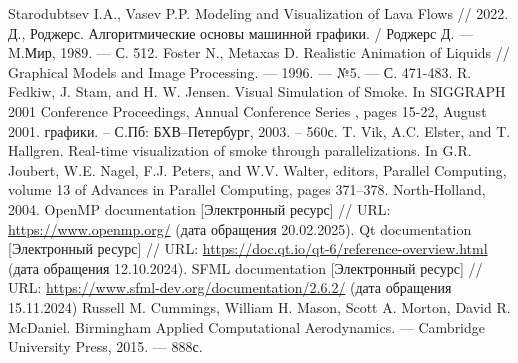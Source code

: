 \begin{thebibliography}{}
	 Starodubtsev I.A., Vasev P.P. Modeling and Visualization of Lava Flows // 2022.
	 Д., Роджерс. Алгоритмические основы машинной графики. / Роджерс Д.
	— M.Мир, 1989. — С. 512. 
	 Foster N., Metaxas D. Realistic Animation of Liquids // Graphical Models and Image Processing. --- 1996. --- №5. --- С. 471-483.
	R. Fedkiw, J. Stam, and H. W. Jensen. Visual Simulation of Smoke. In SIGGRAPH 2001 Conference Proceedings, Annual Conference Series , pages 15-22, August 2001.
	графики. – С.Пб: БХВ–Петербург, 2003. – 560с.
	 T. Vik, A.C. Elster, and T. Hallgren. Real-time visualization of smoke through parallelizations. In
	G.R. Joubert, W.E. Nagel, F.J. Peters, and W.V. Walter, editors, Parallel Computing, volume 13 of Advances in Parallel Computing, pages 371–378. North-Holland, 2004.
	 OpenMP documentation [Электронный ресурс] // URL: \url{https://www.openmp.org/} (дата обращения 20.02.2025).
	 Qt documentation [Электронный ресурс] // URL: \url{https://doc.qt.io/qt-6/reference-overview.html} (дата обращения 12.10.2024).
	 SFML documentation [Электронный ресурс] // URL: \url{https://www.sfml-dev.org/documentation/2.6.2/} (дата обращения 15.11.2024)
	 Russell M. Cummings, William H. Mason, Scott A. Morton, David R. McDaniel. Birmingham Applied Computational Aerodynamics. --- Cambridge University Press,  2015. --- 888с.
\end{thebibliography}
